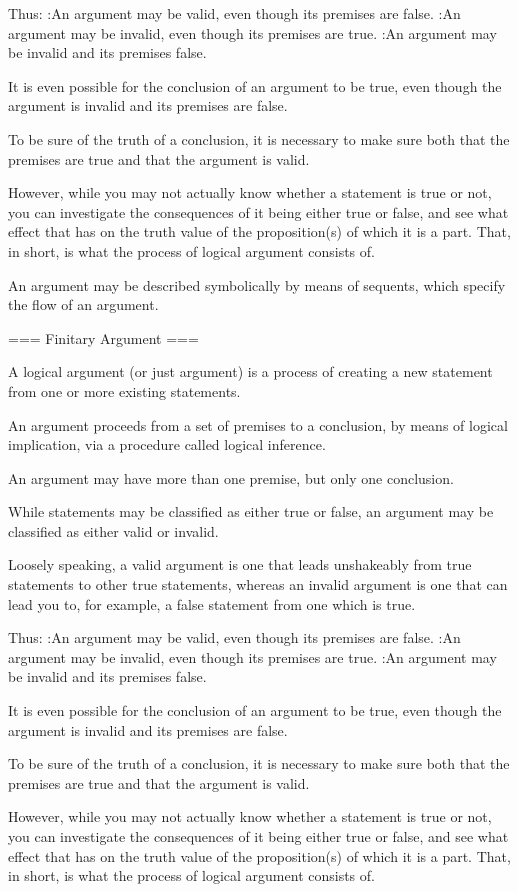 Thus:
:An argument may be valid, even though its premises are false.
:An argument may be invalid, even though its premises are true.
:An argument may be invalid and its premises false.

It is even possible for the conclusion of an argument to be true, even though the argument is invalid and its premises are false.


To be sure of the truth of a conclusion, it is necessary to make sure both that the premises are true and that the argument is valid.


However, while you may not actually know whether a statement is true or not, you can investigate the consequences of it being either true or false, and see what effect that has on the truth value of the proposition(s) of which it is a part. That, in short, is what the process of logical argument consists of.


An argument may be described symbolically by means of sequents, which specify the flow of an argument.


=== Finitary Argument ===

A logical argument (or just argument) is a process of creating a new statement from one or more existing statements.

An argument proceeds from a set of premises to a conclusion, by means of logical implication, via a procedure called logical inference.


An argument may have more than one premise, but only one conclusion.


While statements may be classified as either true or false, an argument may be classified as either valid or invalid.


Loosely speaking, a valid argument is one that leads unshakeably from true statements to other true statements, whereas an invalid argument is one that can lead you to, for example, a false statement from one which is true.


Thus:
:An argument may be valid, even though its premises are false.
:An argument may be invalid, even though its premises are true.
:An argument may be invalid and its premises false.

It is even possible for the conclusion of an argument to be true, even though the argument is invalid and its premises are false.


To be sure of the truth of a conclusion, it is necessary to make sure both that the premises are true and that the argument is valid.


However, while you may not actually know whether a statement is true or not, you can investigate the consequences of it being either true or false, and see what effect that has on the truth value of the proposition(s) of which it is a part. That, in short, is what the process of logical argument consists of.


